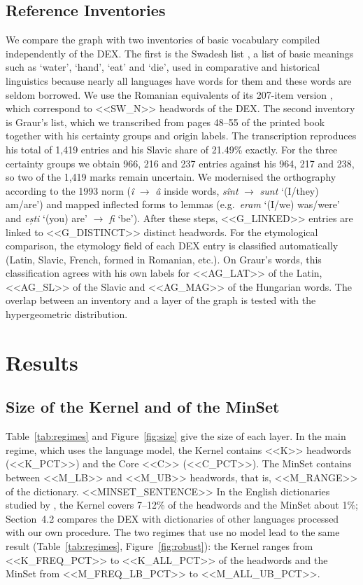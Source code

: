 \documentclass[11pt]{article}
\newcommand{\ro}[1]{\textit{#1}}
\begin{document}
\subsection{Reference Inventories}
We compare the graph with two inventories of basic vocabulary compiled independently of the DEX. The first is the Swadesh list \cite{swadesh1955}, a list of basic meanings such as `water', `hand', `eat' and `die', used in comparative and historical linguistics because nearly all languages have words for them and these words are seldom borrowed. We use the Romanian equivalents of its 207-item version \cite{wiktionary_swadesh}, which correspond to <<SW_N>> headwords of the DEX. The second inventory is Graur's list, which we transcribed from pages 48--55 of the printed book together with his certainty groups and origin labels. The transcription reproduces his total of 1,419 entries and his Slavic share of 21.49\% exactly. For the three certainty groups we obtain 966, 216 and 237 entries against his 964, 217 and 238, so two of the 1,419 marks remain uncertain. We modernised the orthography according to the 1993 norm (\ro{î} $\rightarrow$ \ro{â} inside words, \ro{sînt} $\rightarrow$ \ro{sunt} `(I/they) am/are') and mapped inflected forms to lemmas (e.g.\ \ro{eram} `(I/we) was/were' and \ro{ești} `(you) are' $\rightarrow$ \ro{fi} `be'). After these steps, <<G_LINKED>> entries are linked to <<G_DISTINCT>> distinct headwords. For the etymological comparison, the etymology field of each DEX entry is classified automatically (Latin, Slavic, French, formed in Romanian, etc.). On Graur's words, this classification agrees with his own labels for <<AG_LAT>> of the Latin, <<AG_SL>> of the Slavic and <<AG_MAG>> of the Hungarian words. The overlap between an inventory and a layer of the graph is tested with the hypergeometric distribution.

\section{Results}
\subsection{Size of the Kernel and of the MinSet}
Table~\ref{tab:regimes} and Figure~\ref{fig:size} give the size of each layer. In the main regime, which uses the language model, the Kernel contains <<K>> headwords (<<K_PCT>>) and the Core <<C>> (<<C_PCT>>). The MinSet contains between <<M_LB>> and <<M_UB>> headwords, that is, <<M_RANGE>> of the dictionary. <<MINSET_SENTENCE>> In the English dictionaries studied by , the Kernel covers 7--12\% of the headwords and the MinSet about 1\%; Section~4.2 compares the DEX with dictionaries of other languages processed with our own procedure. The two regimes that use no model lead to the same result (Table~\ref{tab:regimes}, Figure~\ref{fig:robust}): the Kernel ranges from <<K_FREQ_PCT>> to <<K_ALL_PCT>> of the headwords and the MinSet from <<M_FREQ_LB_PCT>> to <<M_ALL_UB_PCT>>.
\end{document}
